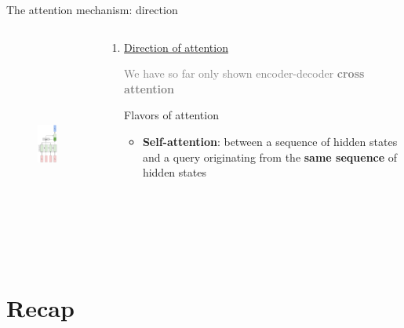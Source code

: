 \documentclass[12pt,aspectratio=169,handout]{beamer}
\newcounter{saveenumi}
\newcommand{\conti}{\setcounter{enumi}{\value{saveenumi}}}
\begin{document}
\begin{frame}{The attention mechanism: direction}

	\begin{columns}[T] %
		\begin{column}{.48\textwidth}
			\begin{figure}[h]
				\includegraphics[height=7cm]{seq2seq_selfattn.pdf}
			\end{figure}
		\end{column}
		\begin{column}{.48\textwidth}
			\begin{enumerate}
				\conti
				\item \underline{Direction of attention}
		
				\textcolor{gray}{We have so far only shown encoder-decoder \textbf{cross attention}}
				\hspace{1em}
				
				Flavors of attention
				\begin{itemize}
					\item \textbf{Self-attention}:
					between a sequence of hidden states and a query originating from the \textbf{same sequence} of hidden states
				\end{itemize}
			\end{enumerate}
		\end{column}
	\end{columns}


\end{frame}

\section*{Recap}

%
%
%
%
\end{document}
